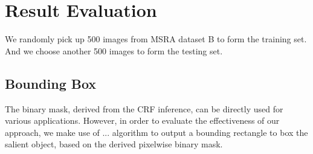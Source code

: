\documentclass[10pt,twocolumn,letterpaper]{article}
\begin{document}
\section{Result Evaluation}
We randomly pick up 500 images from MSRA dataset B to form the training set. And we choose another 500 images to form the testing set.

\subsection{Bounding Box}
The binary mask, derived from the CRF inference, can be directly used for various applications. However, in order to evaluate the effectiveness of our approach, we make use of ... algorithm to output a bounding rectangle to box the salient object, based on the derived pixelwise binary mask. 

\end{document}
